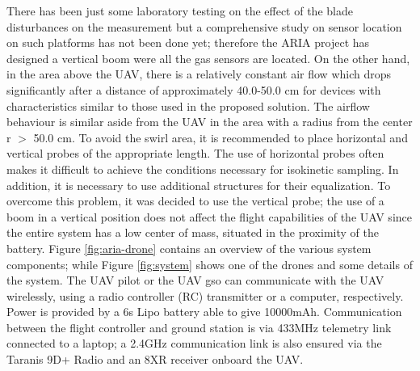 There has been just some laboratory testing on the effect of the blade disturbances on the measurement \cite{8453584}
but a comprehensive study on sensor location on such platforms has not been done yet; therefore
the ARIA project has designed a vertical boom were all the gas sensors are located. On the other
hand, in the area above the UAV, there is a relatively constant air flow which drops significantly after
a distance of approximately 40.0-50.0 cm for devices with characteristics similar to those used in the
proposed solution. The airflow behaviour is similar aside from the UAV in the area with a radius from
the center r $>$ 50.0 cm. To avoid the swirl area, it is recommended to place horizontal and vertical
probes of the appropriate length. The use of horizontal probes often makes it difficult to achieve the
conditions necessary for isokinetic sampling. In addition, it is necessary to use additional structures for their equalization. To overcome this problem, it was decided to use the vertical probe; the use of a
boom in a vertical position does not affect the flight capabilities of the UAV since the entire system has
a low center of mass, situated in the proximity of the battery.
Figure \ref{fig:aria-drone} contains an overview of the various system components; while Figure \ref{fig:system} shows one of the drones and some details of the system.
The UAV pilot or the UAV \gls{gso} can communicate with the UAV
wirelessly, using a radio controller (RC) transmitter or a computer, respectively.
Power is provided by a 6s Lipo battery able to give 10000mAh. Communication
between the flight controller and ground station is via 433MHz telemetry link connected to a laptop; a
2.4GHz communication link is also ensured via the Taranis 9D+ Radio and an 8XR receiver onboard the
UAV.
\clearpage
